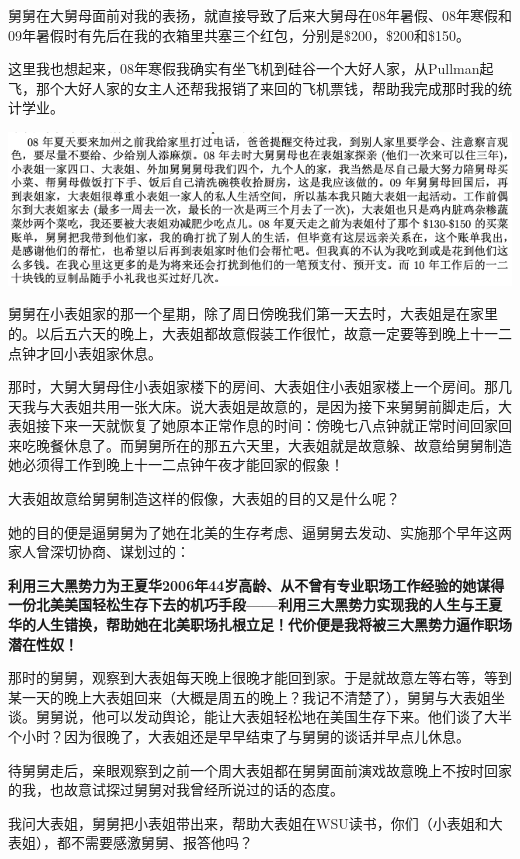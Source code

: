 \documentclass[9pt, b5paper]{article}
\begin{document}
舅舅在大舅母面前对我的表扬，就直接导致了后来大舅母在08年暑假、08年寒假和09年暑假时有先后在我的衣箱里共塞三个红包，分别是\$200，\$200和\$150。

这里我也想起来，08年寒假我确实有坐飞机到硅谷一个大好人家，从Pullman起飞，那个大好人家的女主人还帮我报销了来回的飞机票钱，帮助我完成那时我的统计学业。 

\begin{center}
\includegraphics[width=.9\linewidth]{./pic/p1p91-4.png}
\end{center}

舅舅在小表姐家的那一个星期，除了周日傍晚我们第一天去时，大表姐是在家里的。以后五六天的晚上，大表姐都故意假装工作很忙，故意一定要等到晚上十一二点钟才回小表姐家休息。

那时，大舅大舅母住小表姐家楼下的房间、大表姐住小表姐家楼上一个房间。那几天我与大表姐共用一张大床。说大表姐是故意的，是因为接下来舅舅前脚走后，大表姐接下来一天就恢复了她原本正常作息的时间：傍晚七八点钟就正常时间回家回来吃晚餐休息了。而舅舅所在的那五六天里，大表姐就是故意躲、故意给舅舅制造她必须得工作到晚上十一二点钟午夜才能回家的假象！

大表姐故意给舅舅制造这样的假像，大表姐的目的又是什么呢？

她的目的便是逼舅舅为了她在北美的生存考虑、逼舅舅去发动、实施那个早年这两家人曾深切协商、谋划过的：

\textbf{利用三大黑势力为王夏华2006年44岁高龄、从不曾有专业职场工作经验的她谋得一份北美美国轻松生存下去的机巧手段——利用三大黑势力实现我的人生与王夏华的人生错换，帮助她在北美职场扎根立足！代价便是我将被三大黑势力逼作职场潜在性奴！}

那时的舅舅，观察到大表姐每天晚上很晚才能回到家。于是就故意左等右等，等到某一天的晚上大表姐回来（大概是周五的晚上？我记不清楚了），舅舅与大表姐坐谈。舅舅说，他可以发动舆论，能让大表姐轻松地在美国生存下来。他们谈了大半个小时？因为很晚了，大表姐还是早早结束了与舅舅的谈话并早点儿休息。

待舅舅走后，亲眼观察到之前一个周大表姐都在舅舅面前演戏故意晚上不按时回家的我，也故意试探过舅舅对我曾经所说过的话的态度。

我问大表姐，舅舅把小表姐带出来，帮助大表姐在WSU读书，你们（小表姐和大表姐），都不需要感激舅舅、报答他吗？
\end{document}
